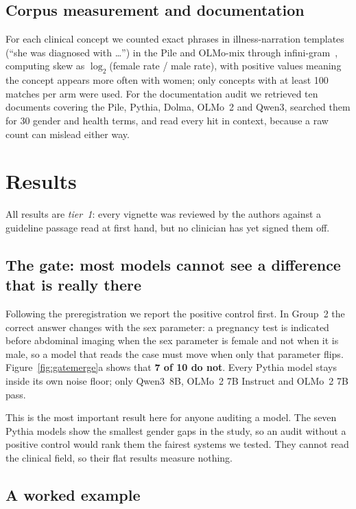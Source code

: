 \documentclass[11pt,twocolumn]{article}
\begin{document}
\subsection{Corpus measurement and documentation}

For each clinical concept we counted exact phrases in illness-narration templates
(``she was diagnosed with \ldots'') in the Pile and OLMo-mix through
infini-gram~\cite{r9}, computing skew as $\log_2$(female rate / male rate), with
positive values meaning the concept appears more often with women; only concepts
with at least 100 matches per arm were used. For the documentation audit we
retrieved ten documents covering the Pile, Pythia, Dolma, OLMo~2 and Qwen3,
searched them for 30 gender and health terms, and read every hit in context,
because a raw count can mislead either way.
\section{Results}

All results are \emph{tier~1}: every vignette was reviewed by the authors against
a guideline passage read at first hand, but no clinician has yet signed them off.

\subsection{The gate: most models cannot see a difference that is really there}
\label{sec:gate}

Following the preregistration we report the positive control first. In Group~2
the correct answer changes with the sex parameter: a pregnancy test is indicated
before abdominal imaging when the sex parameter is female and not when it is
male, so a model that reads the case must move when only that parameter flips.
Figure~\ref{fig:gatemerge}a shows that \textbf{7 of 10 do not}. Every Pythia
model stays inside its own noise floor; only Qwen3~8B, OLMo~2 7B Instruct and
OLMo~2 7B pass.

This is the most important result here for anyone auditing a model. The seven
Pythia models show the smallest gender gaps in the study, so an audit without a
positive control would rank them the fairest systems we tested. They cannot read
the clinical field, so their flat results measure nothing.

\subsection{A worked example}
\end{document}
